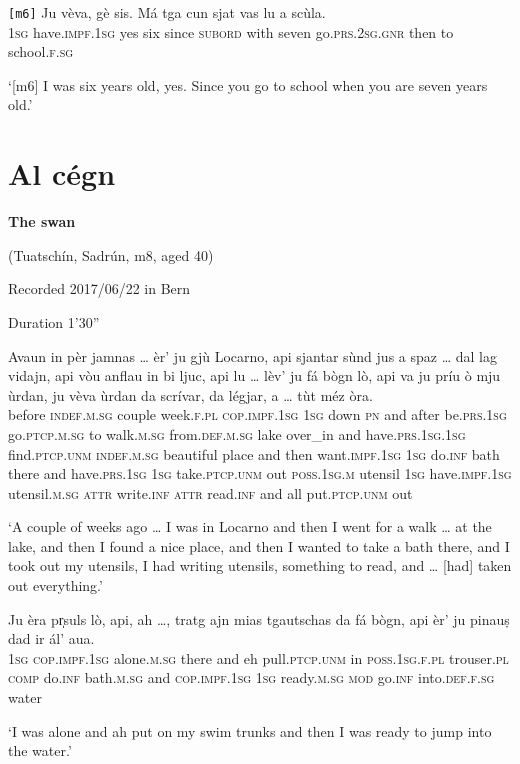 \begin{linenumbers}
	\gll    \texttt{[m6]} Ju vèva, gè sis. Má tga cun sjat vas lu a scùla.\\
	{} \textsc{1sg}  have.\textsc{impf.1sg} yes six since  \textsc{subord} with seven go.\textsc{prs.2sg.gnr} then to school.\textsc{f.sg}\\
\end{linenumbers}
\medskip
\glt `[m6] I was six years old, yes. Since you go to school when you are seven years old.'
\medskip


\section{Al cégn}
\textbf{The swan}

\noindent
(Tuatschín, Sadrún, m8, aged 40)

\noindent
Recorded 2017/06/22 in Bern

\noindent
Duration 1'30''
\bigskip

\begin{linenumbers}
\gll  Avaun in pèr jamnas … èr’ ju gjù Locarno, api sjantar sùnd jus a spaz … dal lag vidajn, api vòu anflau in bi ljuc, api lu … lèv’ ju fá bògn lò, api va ju príu ò mju ùrdan, ju vèva ùrdan da scrívar, da légjar, a … tùt méz òra.\\
before \textsc{indef.m.sg} couple week.\textsc{f.pl} {} \textsc{cop.impf.1sg} \textsc{1sg} down \textsc{pn} and after be.\textsc{prs.1sg} go.\textsc{ptcp.m.sg} to walk.\textsc{m.sg} {} from.\textsc{def.m.sg} lake over\_in and have.\textsc{prs.1sg.1sg} find.\textsc{ptcp.unm} \textsc{indef.m.sg} beautiful place and then {} want.\textsc{impf.1sg} \textsc{1sg} do.\textsc{inf} bath there and have.\textsc{prs.1sg} \textsc{1sg} take.\textsc{ptcp.unm} out \textsc{poss.1sg.m} utensil \textsc{1sg} have.\textsc{impf.1sg} utensil.\textsc{m.sg} \textsc{attr} write.\textsc{inf} \textsc{attr} read.\textsc{inf} and {} all put.\textsc{ptcp.unm} out  \\
\end{linenumbers}
\medskip
\glt `A couple of weeks ago … I was in Locarno and then I went for a walk … at the lake, and then I found a nice place, and then I wanted to take a bath there, and I took out my utensils, I had writing utensils, something to read, and … [had] taken out everything.'
\medskip

\begin{linenumbers}
\gll  Ju èra pr̩suls lò, api, ah …, tratg ajn mias tgautschas da fá bògn, api èr’ ju pinauṣ dad ir ál’ aua.  \\
 \textsc{1sg} \textsc{cop.impf.1sg} alone.\textsc{m.sg} there and eh {} pull.\textsc{ptcp.unm} in \textsc{poss.1sg.f.pl} trouser.\textsc{pl} \textsc{comp} do.\textsc{inf} bath.\textsc{m.sg} and \textsc{cop.impf.1sg} \textsc{1sg} ready.\textsc{m.sg} \textsc{mod} go.\textsc{inf} into.\textsc{def.f.sg} water\\
\end{linenumbers}
\medskip
\glt `I was alone and ah put on my swim trunks and then I was ready to jump into the water.'
\medskip

